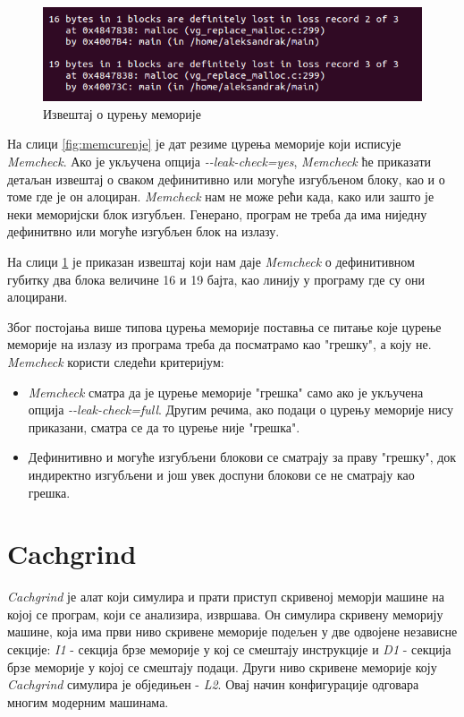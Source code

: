 \documentclass[12pt,oneside]{memoir}
\begin{document}
\begin{figure}[h!]
\begin{center}
\includegraphics[scale=0.75]{slika9.png}
\end{center}
\caption{Извештај о цурењу меморије}
\label{fig:memizv}
\end{figure}


\indent На слици \ref{fig:memcurenje} је дат резиме цурења меморије који исписује \textit{Memcheck}. Ако је укључена опција \textit{-\--leak-check=yes}, \textit{Memcheck} ће приказати детаљан извештај о сваком дефинитивно или могуће изгубљеном блоку,  као и о томе где је он алоциран. \textit{Memcheck} нам не може рећи када, како или зашто је неки меморијски блок изгубљен. Генерано, програм не треба да има ниједну дефинитвно или могуће изгубљен блок на излазу.

\indent На слици \ref{fig:memizv} је приказан извештај који нам даје \textit{Memcheck} о дефинитивном губитку два блока величине 16 и 19 бајта, као линију у програму где су они алоцирани.

\indent Због постојања више типова цурења меморије поставња се питање које цурење меморије на излазу из програма треба да посматрамо као "грешку", а коју не. \textit{Memcheck} користи следећи критеријум:

\begin{itemize}
  \item \textit{Memcheck} сматра да је цурење меморије "грешка" само ако је укључена опција \textit{-\--leak-check=full}. Другим речима, ако подаци о цурењу меморије нису приказани, сматра се да то цурење није "грешка".
  \item Дефинитивно и могуће изгубљени блокови се сматрају за праву "грешку", док индиректно изгубљени и још увек доспуни блокови се не сматрају као грешка.
\end{itemize}


\section{Cachgrind}

\indent \textit{Cachgrind} је алат који симулира и прати приступ скривеној меморји машине на којој се програм, који се анализира, извршава. Он симулира скривену меморију машине, која има први ниво скривене меморије подељен у две одвојене независне секције: \textit{I1} - секција брзе меморије у кој се смештају инструкције и \textit{D1} - секција брзе меморије у којој се смештају подаци. Други ниво скривене меморије коју \textit{Cachgrind} симулира је обједињен - \textit{L2}. Овај начин конфигурације одговара многим модерним машинама.
\end{document}

